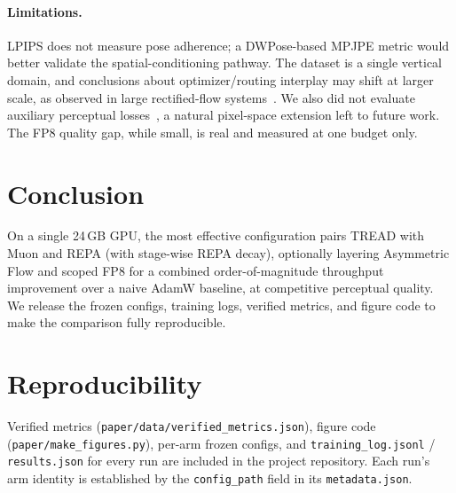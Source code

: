 \documentclass[10pt,twocolumn]{article}
\begin{document}
\paragraph{Limitations.} LPIPS does not measure pose adherence; a DWPose-based
MPJPE metric would better validate the spatial-conditioning pathway. The dataset
is a single vertical domain, and conclusions about optimizer/routing interplay
may shift at larger scale, as observed in large rectified-flow
systems~\citep{esser2024sd3}. We also did not evaluate auxiliary perceptual
losses~\citep{ma2026pixelgen}, a natural pixel-space extension left to future
work. The FP8 quality gap, while small, is real and measured at one budget only.

\section{Conclusion}
On a single 24\,GB GPU, the most effective configuration pairs TREAD with Muon
and REPA (with stage-wise REPA decay), optionally layering Asymmetric Flow and
scoped FP8 for a combined order-of-magnitude throughput improvement over a naive
AdamW baseline, at competitive perceptual quality. We release the frozen
configs, training logs, verified metrics, and figure code to make the comparison
fully reproducible.

\section*{Reproducibility}
Verified metrics (\texttt{paper/data/verified\_metrics.json}), figure code
(\texttt{paper/make\_figures.py}), per-arm frozen configs, and
\texttt{training\_log.jsonl} / \texttt{results.json} for every run are included
in the project repository. Each run's arm identity is established by the
\texttt{config\_path} field in its \texttt{metadata.json}.



\end{document}
